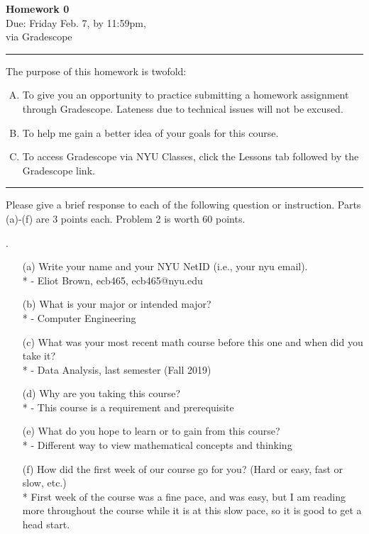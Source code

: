 \documentclass[12pt]{article}
\newif\ifshow
\begin{document}
\begin{center}
\ifshow
  \textbf{\Large Homework 0 Solution}\\
\else
  \textbf{\Large Homework 0}\\
\fi
Due: Friday Feb. 7, by 11:59pm,\\via Gradescope\\
\end{center}

\hrule

\vspace{0.2cm}




\noindent
The purpose of this homework is twofold:
\begin{enumerate}[A.]
\item To give you an opportunity to practice submitting a homework assignment through Gradescope.  Lateness due to technical issues will not be excused.  
\item To help me gain a better idea of your goals for this course.
\item To access Gradescope via NYU Classes, click the Lessons tab followed by the Gradescope link. 
\end{enumerate}

\hrule

\vspace{0.5cm}

\noindent
Please give a brief response to each of the following question or instruction.  Parts (a)-(f) are 3 points each. Problem 2 is worth 60 points.  
\vspace{.15in}


.   
\begin{enumerate}
\item[(a)] Write your name and your NYU NetID (i.e., your nyu email).
 \\*  - Eliot Brown, ecb465, ecb465@nyu.edu
\item[(b)] What is your major or intended major?
 \\* - Computer Engineering 
\item[(c)] What was your most recent math course before this one and when did you take it?
 \\* - Data Analysis, last semester (Fall 2019) 
\item[(d)] Why are you taking this course?
 \\* - This course is a requirement and prerequisite 
\item[(e)] What do you hope to learn or to gain from this course?
 \\* - Different way to view mathematical concepts and thinking
\item[(f)] How did the first week of our course go for you?  (Hard or easy, fast or slow, etc.)
 \\* First week of the course was a fine pace, and was easy, but I am reading more throughout the course while it is at this slow pace, so it is good to get a head start. 
\end{enumerate}
\end{document}
